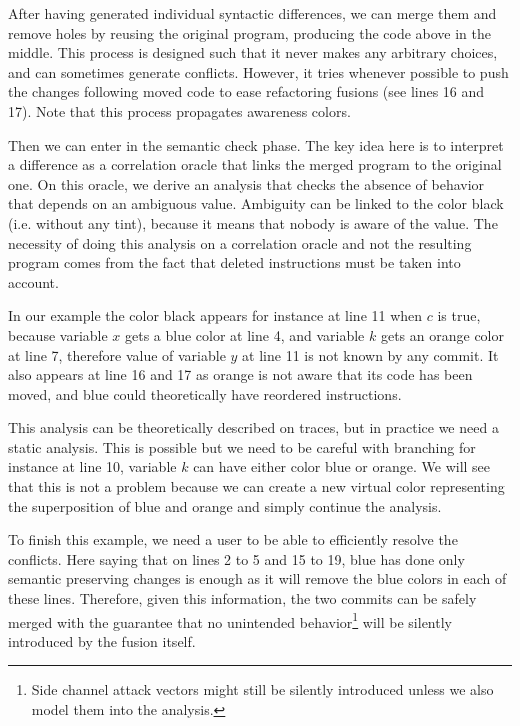 \documentclass[a4paper,10pt]{article}
\begin{document}
After having generated individual syntactic differences, we can merge them  and remove holes by reusing the original program, producing the code above in the middle. This process is designed such that it never makes any arbitrary choices, and can sometimes generate conflicts. However, it tries whenever possible to push the changes following moved code to ease refactoring fusions (see lines 16 and 17). Note that this process propagates awareness colors.

Then we can enter in the semantic check phase. The key idea here is to interpret a difference as a correlation oracle that links the merged program to the original one. On this oracle, we derive an analysis that checks the absence of behavior that depends on an ambiguous value. Ambiguity can be linked to the color black (i.e. without any tint), because it means that nobody is aware of the value. The necessity of doing this analysis on a correlation oracle and not the resulting program comes from the fact that deleted instructions must be taken into account.

In our example the color black appears for instance at line 11 when $c$ is true, because variable $x$ gets a blue color at line 4, and variable $k$ gets an orange color at line 7, therefore value of variable $y$ at line 11 is not known by any commit. It also appears at line 16 and 17 as orange is not aware that its code has been moved, and blue could theoretically have reordered instructions.

This analysis can be theoretically described on traces, but in practice we need a static analysis. This is possible but we need to be careful with branching for instance at line 10, variable $k$ can have either color blue or orange. We will see that this is not a problem because we can create a new virtual color representing the superposition of blue and orange and simply continue the analysis.

To finish this example, we need a user to be able to efficiently resolve the conflicts. Here saying that on lines 2 to 5 and 15 to 19, blue has done only semantic preserving changes is enough as it will remove the blue colors in each of these lines. Therefore, given this information, the two commits can be safely merged with the guarantee that no unintended behavior\footnote{Side channel attack vectors might still be silently introduced unless we also model them into the analysis.} will be silently introduced by the fusion itself.
\end{document}
